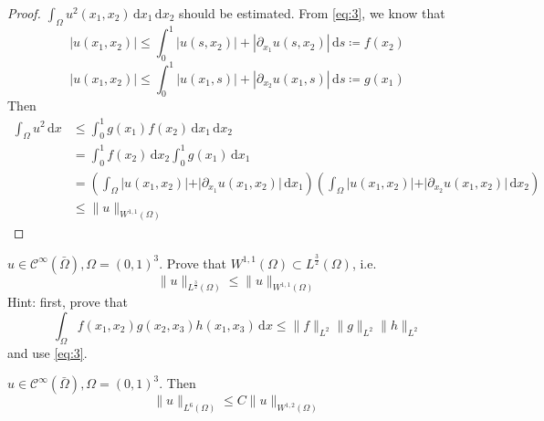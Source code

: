 \documentclass{report}
\begin{document}
\begin{proof}
    \(\int_{\Omega} u^{2}(x_1, x_2) \,\mathrm{d}x_1 \,\mathrm{d}x_2\) should be estimated. From \ref{eq:3}, we know that 
    \[\vert u(x_1, x_2) \vert \leq \int_{0}^{1} \vert u(s, x_2) \vert + |\partial_{x_1} u(s, x_2)| \,\mathrm{d}s \coloneqq f(x_2)\]
    \[\vert u(x_1, x_2) \vert \leq \int_{0}^{1} \vert u(x_1, s) \vert + |\partial_{x_2} u(x_1, s)| \,\mathrm{d}s \coloneqq g(x_1)\]
    Then 
    \begin{align*}
        \int_{\Omega} u^2 \,\mathrm{d}x &\leq \int_{0}^{1} g(x_1)f(x_2) \,\mathrm{d}x_1 \,\mathrm{d}x_2 \\
        &= \int_{0}^{1} f(x_2) \,\mathrm{d}x_2 \int_{0}^{1} g(x_1) \,\mathrm{d}x_1 \\
        &= \left(\int_{\Omega} \vert u(x_1, x_2) \vert + \vert \partial_{x_1} u(x_1, x_2) \vert \,\mathrm{d}x_1 \right) \left(\int_{\Omega} \vert u(x_1, x_2) \vert + \vert \partial_{x_2} u(x_1, x_2) \vert \,\mathrm{d}x_2 \right) \\
        &\leq \|u\|_{W^{1, 1}(\Omega)}
    \end{align*}
\end{proof}

{
    \(u \in \mathcal{C}^{\infty}(\bar{\Omega}), \Omega = (0,1)^3\). Prove that \(W^{1, 1}(\Omega) \subset L^{\frac{3}{2}}(\Omega)\), i.e.
    \begin{equation}\label{eq:4}
        \|u\|_{L^{\frac{3}{2}}(\Omega)} \leq \|u\|_{W^{1, 1}(\Omega)}
    \end{equation}
    Hint: first, prove that
    \[\int_{\Omega} f(x_1, x_2)g(x_2, x_3)h(x_1, x_3) \,\mathrm{d}x \leq \|f\|_{L^{2}} \|g\|_{L^{2}} \|h\|_{L^{2}}\]
    and use \ref{eq:3}.
}

\ex{}
{
    \(u \in \mathcal{C}^{\infty}(\bar{\Omega}), \Omega = (0,1)^3\). Then 
    \begin{equation}
        \|u\|_{L^{6}(\Omega)} \leq C \|u\|_{W^{1, 2}(\Omega)}
    \end{equation}
}
\end{document}

